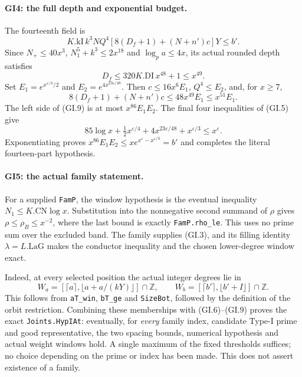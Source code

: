 \documentclass[11pt,a4paper]{article}
\numberwithin{equation}{section}
\theoremstyle{remark}\newtheorem{remark}[theorem]{Remark}
\begin{document}
\paragraph{GI4: the full depth and exponential budget.}
The fourteenth field is
\[
 K.\mathrm{kI}\,k^3NQ^4[8(D_f+1)+(N+n')c]Y\le b'.       \tag{GI.9}
\]
Since $N_+\le40x^3$, $N_1^5+k^3\le2x^{18}$ and
$\log_p a\le4x$, its actual rounded depth satisfies
\[
 D_f\le320K.\mathrm{DI}\,x^{48}+1\le x^{49}.
\]
Set $E_1=e^{x^{\varepsilon/4}/2}$ and
$E_2=e^{4x^{23\varepsilon/48}}$. Then $c\le16x^6E_1$,
$Q^4\le E_2$, and, for $x\ge7$,
\[
 8(D_f+1)+(N+n')c\le48x^{49}E_1\le x^{51}E_1.
\]
The left side of (GI.9) is at most $x^{86}E_1E_2$.
The final four inequalities of (GI.5) give
\[
 85\log x+\tfrac12x^{\varepsilon/4}
       +4x^{23\varepsilon/48}+x^{\varepsilon/3}
       \le x^\varepsilon.
\]
Exponentiating proves $x^{86}E_1E_2\le
xe^{x^\varepsilon-x^{\varepsilon/3}}=b'$ and completes
the literal fourteen-part hypothesis.

\paragraph{GI5: the actual family statement.}
For a supplied \texttt{FamP}, the window hypothesis is the
eventual inequality $N_1\le K.\mathrm{CN}\log x$.
Substitution into the nonnegative second summand of $\rho$ gives
$\rho\le\rho_B\le x^{-2}$, where the last bound is exactly
\texttt{FamP.rho\_le}. This uses no prime sum over the excluded
band. The family supplies (GI.3), and its filling identity
$\lambda=L.\mathrm{LaG}$ makes the conductor inequality and
the chosen lower-degree window exact.

Indeed, at every selected position the actual integer degrees
lie in
\[
 W_a=[\lceil a\rceil,\lfloor a+a/(kY)\rfloor]\cap\mathbb Z,
 \qquad
 W_b=[\lceil b'\rceil,\lfloor b'+I\rfloor]\cap\mathbb Z.  \tag{GI.10}
\]
This follows from \texttt{aT\_win}, \texttt{bT\_ge} and
\texttt{SizeBot}, followed by the definition of the orbit
restriction. Combining these memberships with (GI.6)--(GI.9)
proves the exact \texttt{Joints.HypIAt}: eventually, for
\emph{every} family index, candidate Type-I prime and good
representative, the two spacing bounds, numerical hypothesis
and actual weight windows hold. A single maximum of the fixed
thresholds suffices; no choice depending on the prime or index
has been made. This does not assert existence of a family.
\end{document}

